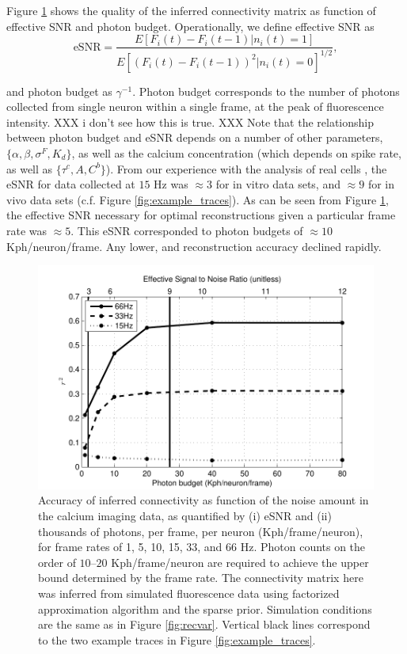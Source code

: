 Figure \ref{fig:recvar-SNR} shows the quality of the inferred connectivity matrix as function of effective SNR and photon budget. Operationally, we define effective SNR as
\begin{equation}
\text{eSNR}=\frac{E[F_i(t)-F_i(t-1)|n_i(t)=1]}{E[(F_i(t)-F_i(t-1))^2|n_i(t)=0]^{1/2}},
\end{equation}

\noindent and photon budget as $\gamma^{-1}$.  Photon budget corresponds to the number of photons collected from single neuron within a single frame, at the peak of fluorescence intensity. XXX i don't see how this is true. XXX Note that the relationship between photon budget and eSNR depends on a number of other parameters, $\{\alpha,\beta,\sigma^F, K_d\}$, as well as the calcium concentration (which depends on spike rate, as well as $\{\tau^c, A, C^b\}$). From our experience with the analysis of real cells \cite{Vogelstein2009}, the eSNR for data collected at $15$ Hz was $\approx 3$ for in vitro data sets, and $\approx 9$ for in vivo data sets (c.f. Figure \ref{fig:example_traces}). As can be seen from Figure \ref{fig:recvar-SNR}, the effective SNR necessary for optimal reconstructions given a particular frame rate was $\approx 5$. This eSNR corresponded to photon budgets of $\approx 10$ Kph/neuron/frame. Any lower, and reconstruction accuracy declined rapidly.  

\begin{figure}[h]
\centering
\begin{minipage}[c]{0.6\hsize}
\includegraphics[width=\hsize]{../figs/FigureA6_recvar_SNRb}
\end{minipage}
\caption{Accuracy of inferred connectivity as function of the noise amount in the calcium imaging data, as quantified by (i) eSNR and (ii) thousands of photons, per frame, per neuron (Kph/frame/neuron), for frame rates of 1, 5, 10, 15, 33, and 66 Hz. Photon counts on the order of $10$--$20$ Kph/frame/neuron are required to achieve the upper bound determined by the frame rate. The connectivity matrix here was inferred from simulated fluorescence data using factorized approximation algorithm and the sparse prior. Simulation conditions are the same as in Figure \ref{fig:recvar}.  Vertical black lines correspond to the two example traces in Figure \ref{fig:example_traces}.}
\label{fig:recvar-SNR}
\end{figure}

